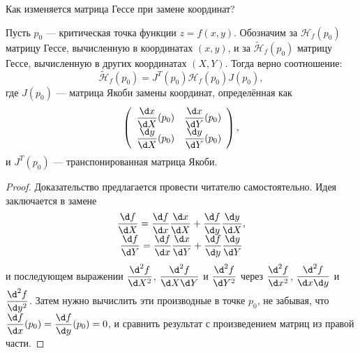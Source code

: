 \documentclass[a4paper,12pt,openany,leqno]{extbook}
\begin{document}
    Как изменяется матрица Гессе при замене координат?
    
    \begin{lemma}
    Пусть $p_0$ --- критическая точка функции $z = f(x, y)$. Обозначим за $\mathcal{H}_f(p_0)$ матрицу Гессе, вычисленную в координатах $(x, y)$, и за $\widetilde{\mathcal{H}}_f(p_0)$ матрицу Гессе, вычисленную в других координатах $(X, Y)$. Тогда верно соотношение:
    \begin{equation}
    \widetilde{\mathcal{H}}_f(p_0) = J^T(p_0)\mathcal{H}_f(p_0)J(p_0),
    \end{equation}
    где $J(p_0)$ --- матрица Якоби замены координат, определённая как
    \begin{equation}
    \left(
  \begin{array}{cc}
    \dfrac{\d x}{\d X}(p_0) & \dfrac{\d x}{\d Y}(p_0)\\
    \dfrac{\d y}{\d X}(p_0) & \dfrac{\d y}{\d Y}(p_0)
  \end{array}
    \right),
    \end{equation}
    и $J^T(p_0)$ --- транспонированная матрица Якоби.
    \label{lm:hessian_transform_2d}
    \end{lemma}
    
    \begin{proof}
    Доказательство предлагается провести читателю самостоятельно. Идея заключается в замене
\[
  \begin{array}{cc}
    \dfrac{\d f}{\d X} = \dfrac{\d f}{\d x}\dfrac{\d x}{\d X} + \dfrac{\d f}{\d y}\dfrac{\d y}{\d X},\\
    \dfrac{\d f}{\d Y} = \dfrac{\d f}{\d x}\dfrac{\d x}{\d Y} + \dfrac{\d f}{\d y}\dfrac{\d y}{\d Y}
  \end{array}
\]
  и последующем выражении $\dfrac{\d^2 f}{\d X^2}$, $\dfrac{\d^2 f}{\d X \d Y}$ и $\dfrac{\d^2 f}{\d Y^2}$ через $\dfrac{\d^2 f}{\d x^2}$, $\dfrac{\d^2 f}{\d x \d y}$ и $\dfrac{\d^2 f}{\d y^2}$. Затем нужно вычислить эти производные в точке $p_0$, не забывая, что $\dfrac{\d f}{\d x}(p_0) = \dfrac{\d f}{\d y}(p_0) = 0$, и сравнить результат с произведением матриц из правой части.
    \end{proof}
    
\end{document}
